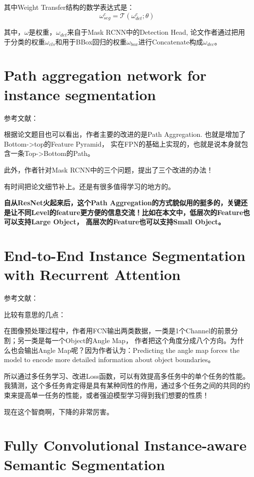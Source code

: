 其中Weight Transfer结构的数学表达式是：
\begin{displaymath}
\omega_{seg}^c = \mathcal{T}(\omega_{det}^c; \theta)
\end{displaymath}

其中，$\omega$是权重，$\omega_{det}$来自于Mask RCNN中的Detection Head, 论文作者通过把用于分类的权重$\omega_{cls}$和用于BBox回归的权重$\omega_{box}$进行Concatenate构成$\omega_{dec}$。

\section{Path aggregation network for instance segmentation}

参考文献：\cite{liu2018path}

根据论文题目也可以看出，作者主要的改进的是Path Aggregation. 也就是增加了Bottom->top的Feature Pyramid， 实在FPN的基础上实现的，也就是说本身就包含一条Top->Bottom的Path。

此外，作者针对Mask RCNN中的三个问题，提出了三个改进的办法！


有时间把论文细节补上。还是有很多值得学习的地方的。

{\color{red} \bfseries 自从ResNet火起来后，这个Path Aggregation的方式貌似用的挺多的，关键还是让不同Level的feature更方便的信息交流！比如在本文中，低层次的Feature也可以支持Large Object， 高层次的Feature也可以支持Small Object。}


\section{End-to-End Instance Segmentation with Recurrent Attention}

参考文献：\cite{ren2017end}

比较有意思的几点：

在图像预处理过程中，作者用FCN输出两类数据，一类是1个Channel的前景分割；另一类是每一个Object的Angle Map， 作者把这个角度分成八个方向。为什么也会输出Angle Map呢？因为作者认为：Predicting the angle map forces the model to encode more detailed information about object boundaries。

{\color{red} 所以通过多任务学习、改进Loss函数，可以有效提高多任务中的单个任务的性能。我猜测，这个多任务肯定得是具有某种同性的作用，通过多个任务之间的共同的约束来提高单一任务的性能，或者强迫模型学习得到我们想要的性质！}

现在这个智商啊，下降的非常厉害。

\section{Fully Convolutional Instance-aware Semantic Segmentation}


